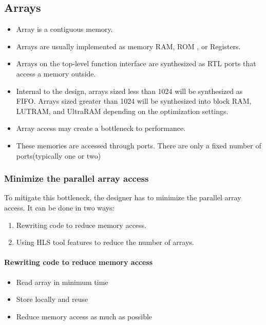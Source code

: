 \subsection{Arrays}
\begin{itemize}
  \item Array is a contiguous memory. 
  \item Arrays are usually implemented as memory \ie RAM, ROM , or Registers. 
  \item Arrays on the top-level function interface are synthesized as RTL ports that access a memory outside.
  \item Internal to the design, arrays sized less than 1024 will be synthesized as FIFO. Arrays sized greater than 1024 will be synthesized into block RAM, LUTRAM, and UltraRAM depending on the optimization settings.
  \item Array access may create a bottleneck to performance. 
  \item These memories are accessed through ports. There are only a fixed number of ports(typically one or two)
\end{itemize}

\subsubsection{Minimize the parallel array access}
To mitigate this bottleneck, the designer has to minimize the parallel array access. It can be done in two ways: 
\begin{enumerate}
  \item Rewriting code to reduce memory access.
  \item Using HLS tool features to reduce the number of arrays.
\end{enumerate}

\paragraph{Rewriting code to reduce memory access}
\begin{itemize}
  \item Read array in minimum time
  \item Store locally and reuse
  \item Reduce memory access as much as possible 
\end{itemize}

